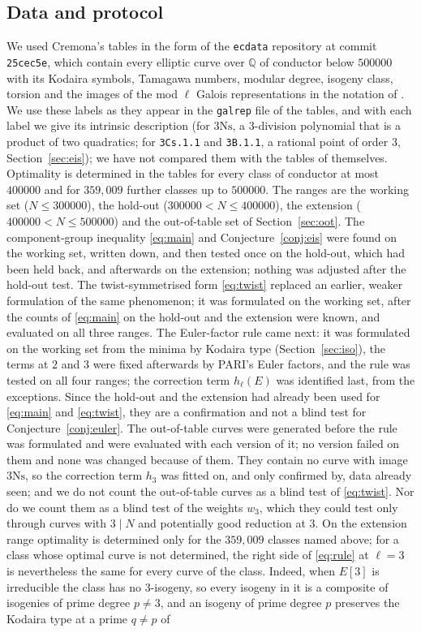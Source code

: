 \documentclass[11pt]{amsart}
\theoremstyle{definition}
\newcommand{\Q}{\mathbb{Q}}
\newcommand{\Ns}{3\mathrm{Ns}}
\begin{document}
\subsection{Data and protocol}
We used Cremona's tables \cite{Cremona97} in the form of the \texttt{ecdata} repository at commit \texttt{25cec5e}, which contain every elliptic curve over $\Q$ of conductor below $500000$ with its Kodaira symbols, Tamagawa numbers, modular degree, isogeny class, torsion and the images of the mod $\ell$ Galois representations in the notation of \cite{Sutherland16}. We use these labels as they appear in the \texttt{galrep} file of the tables, and with each label we give its intrinsic description (for $\Ns$, a $3$-division polynomial that is a product of two quadratics; for \texttt{3Cs.1.1} and \texttt{3B.1.1}, a rational point of order $3$, Section~\ref{sec:eis}); we have not compared them with the tables of \cite{Sutherland16} themselves. Optimality is determined in the tables for every class of conductor at most $400000$ and for $359{,}009$ further classes up to $500000$. The ranges are the working set ($N\le300000$), the hold-out ($300000<N\le400000$), the extension ($400000<N\le500000$) and the out-of-table set of Section~\ref{sec:oot}. The component-group inequality \eqref{eq:main} and Conjecture~\ref{conj:eis} were found on the working set, written down, and then tested once on the hold-out, which had been held back, and afterwards on the extension; nothing was adjusted after the hold-out test. The twist-symmetrised form \eqref{eq:twist} replaced an earlier, weaker formulation of the same phenomenon; it was formulated on the working set, after the counts of \eqref{eq:main} on the hold-out and the extension were known, and evaluated on all three ranges. The Euler-factor rule came next: it was formulated on the working set from the minima by Kodaira type (Section~\ref{sec:iso}), the terms at $2$ and $3$ were fixed afterwards by PARI's Euler factors, and the rule was tested on all four ranges; the correction term $h_\ell(E)$ was identified last, from the exceptions. Since the hold-out and the extension had already been used for \eqref{eq:main} and \eqref{eq:twist}, they are a confirmation and not a blind test for Conjecture~\ref{conj:euler}. The out-of-table curves were generated before the rule was formulated and were evaluated with each version of it; no version failed on them and none was changed because of them. They contain no curve with image $\Ns$, so the correction term $h_3$ was fitted on, and only confirmed by, data already seen; and we do not count the out-of-table curves as a blind test of \eqref{eq:twist}. Nor do we count them as a blind test of the weights $w_3$, which they could test only through curves with $3\mid N$ and potentially good reduction at $3$. On the extension range optimality is determined only for the $359{,}009$ classes named above; for a class whose optimal curve is not determined, the right side of \eqref{eq:rule} at $\ell=3$ is nevertheless the same for every curve of the class. Indeed, when $E[3]$ is irreducible the class has no $3$-isogeny, so every isogeny in it is a composite of isogenies of prime degree $p\ne3$, and an isogeny of prime degree $p$ preserves the Kodaira type at a prime $q\ne p$ of 
\end{document}
